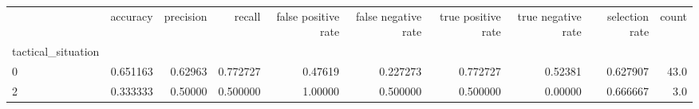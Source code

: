 \begin{tabular}{lrrrrrrrrr}
\toprule
{} &  accuracy &  precision &    recall &  false positive rate &  false negative rate &  true positive rate &  true negative rate &  selection rate &  count \\
tactical\_situation &           &            &           &                      &                      &                     &                     &                 &        \\
\midrule
0                  &  0.651163 &    0.62963 &  0.772727 &              0.47619 &             0.227273 &            0.772727 &             0.52381 &        0.627907 &   43.0 \\
2                  &  0.333333 &    0.50000 &  0.500000 &              1.00000 &             0.500000 &            0.500000 &             0.00000 &        0.666667 &    3.0 \\
\bottomrule
\end{tabular}
